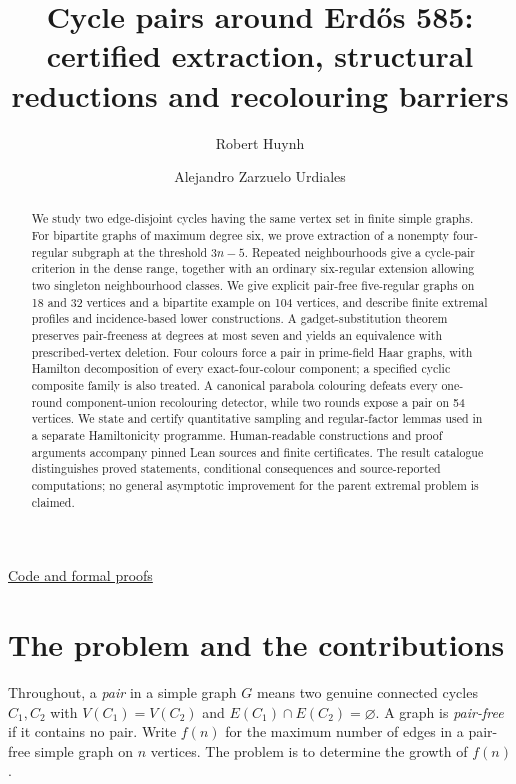 \documentclass[smallextended]{svjour3}
\title{Cycle pairs around Erdős 585: certified extraction, structural reductions and recolouring barriers}
\author{Robert Huynh \and Alejandro Zarzuelo Urdiales}
\institute{Robert Huynh (corresponding author) \at \href{https://www.hbs.edu/}{Harvard Business School} \and Alejandro Zarzuelo Urdiales \at \href{https://rsihouse.ai/openmath}{Open Math}}
\date{} %
\newcounter{none} %
\begin{document}
\maketitle

\begin{abstract}
We study two edge-disjoint cycles having the same vertex set in finite
simple graphs. For bipartite graphs of maximum degree six, we prove
extraction of a nonempty four-regular subgraph at the threshold
\(3n-5\). Repeated neighbourhoods give a cycle-pair criterion in the
dense range, together with an ordinary six-regular extension allowing
two singleton neighbourhood classes. We give explicit pair-free
five-regular graphs on 18 and 32 vertices and a bipartite example on 104
vertices, and describe finite extremal profiles and incidence-based
lower constructions. A gadget-substitution theorem preserves
pair-freeness at degrees at most seven and yields an equivalence with
prescribed-vertex deletion. Four colours force a pair in prime-field
Haar graphs, with Hamilton decomposition of every exact-four-colour
component; a specified cyclic composite family is also treated. A
canonical parabola colouring defeats every one-round component-union
recolouring detector, while two rounds expose a pair on 54 vertices. We
state and certify quantitative sampling and regular-factor lemmas used
in a separate Hamiltonicity programme. Human-readable constructions and
proof arguments accompany pinned Lean sources and finite certificates.
The result catalogue distinguishes proved statements, conditional
consequences and source-reported computations; no general asymptotic
improvement for the parent extremal problem is claimed.
\end{abstract}

\begin{center}\small\href{https://github.com/alejandrozu/openmath-2026-judging/tree/70c5ec3107658182f22c207d4c50f53f9cb3e602/robert-review-2026-10-07}{Code and formal proofs}\end{center}

\section{The problem and the
contributions}\label{the-problem-and-the-contributions}

Throughout, a \emph{pair} in a simple graph \(G\) means two genuine
connected cycles \(C_1,C_2\) with \(V(C_1)=V(C_2)\) and
\(E(C_1)\cap E(C_2)=\varnothing\). A graph is \emph{pair-free} if it
contains no pair. Write \(f(n)\) for the maximum number of edges in a
pair-free simple graph on \(n\) vertices. The problem is to determine
the growth of \(f(n)\).
\end{document}
